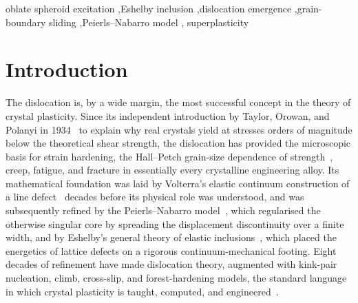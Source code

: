\documentclass[5p,sort&compress]{elsarticle}
\begin{document}
\begin{frontmatter}
\begin{keyword}
oblate spheroid excitation \sep Eshelby inclusion \sep dislocation
emergence \sep grain-boundary sliding \sep Peierls--Nabarro model \sep
superplasticity
\end{keyword}
\end{frontmatter}

\section{Introduction}
\label{sec:intro}

The dislocation is, by a wide margin, the most successful concept in
the theory of crystal plasticity. Since its independent introduction
by Taylor, Orowan, and Polanyi in 1934~\cite{taylor1934,orowan1934,polanyi1934}
to explain why real crystals yield at stresses orders of magnitude
below the theoretical shear strength, the dislocation has provided
the microscopic basis for strain hardening, the Hall--Petch grain-size
dependence of strength~\cite{hall1951,petch1953}, creep, fatigue, and
fracture in essentially every crystalline engineering alloy. Its
mathematical foundation was laid by Volterra's elastic continuum
construction of a line defect~\cite{volterra1907} decades before its
physical role was understood, and was subsequently refined by the
Peierls--Nabarro model~\cite{peierls1940,nabarro1947}, which regularised
the otherwise singular core by spreading the displacement
discontinuity over a finite width, and by Eshelby's general theory of
elastic inclusions~\cite{eshelby1957}, which placed the energetics of
lattice defects on a rigorous continuum-mechanical footing. Eight
decades of refinement have made dislocation theory, augmented with
kink-pair nucleation, climb, cross-slip, and forest-hardening models,
the standard language in which crystal plasticity is taught,
computed, and engineered~\cite{hirth1982}.
\end{document}
